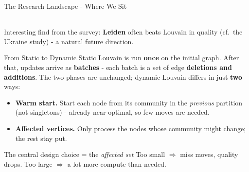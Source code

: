 \documentclass[aspectratio=169]{beamer}
\begin{document}
\begin{frame}{The Research Landscape - Where We Sit}
    \centering
    \\[0.5em]
    {\small Interesting find from the survey: \textbf{Leiden} often beats Louvain in quality
    (cf.\ the Ukraine study) - a natural future direction.}
\end{frame}

\begin{frame}{From Static to Dynamic}
    Static Louvain is run \textbf{once} on the initial graph. After that, updates arrive as
    \textbf{batches} - each batch is a set of edge \textbf{deletions and additions}.
    The two phases are unchanged; dynamic Louvain differs in just \textbf{two} ways:
    \begin{itemize}
        \item \textbf{Warm start.} Start each node from its community in the \emph{previous}
        partition (not singletons) - already near-optimal, so few moves are needed.
        \item \textbf{Affected vertices.} Only process the nodes whose community might change;
        the rest stay put.
    \end{itemize}
    \begin{alertblock}{The central design choice = the \emph{affected set}}
    Too small $\Rightarrow$ miss moves, quality drops. \quad
    Too large $\Rightarrow$ a lot more compute than needed.
    \end{alertblock}
\end{frame}
\end{document}
